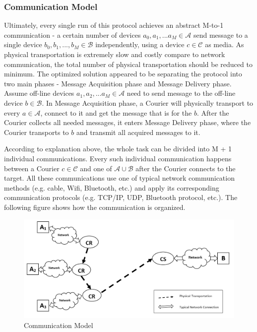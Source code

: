 \subsubsection*{Communication Model}
Ultimately, every single run of this protocol achieves an abstract M-to-1 communication - a certain number of devices $a_0, a_1, ... a_M \in \mathcal{A}$ send message to a single device $b_0, b_1, ..., b_M \in \mathcal{B}$ independently, using a device $c \in \mathcal{C}$ as media. As physical transportation is extremely slow and costly compare to network communication, the total number of physical transportation should be reduced to minimum. The optimized solution appeared to be separating the protocol into two main phases - Message Acquisition phase and Message Delivery phase. Assume off-line devices $a_1, a_2, ... a_M \in \mathcal{A}$ need to send message to the off-line device $b \in \mathcal{B}$. In Message Acquisition phase, a Courier will physically transport to every $a \in \mathcal{A}$, connect to it and get the message that is for the $b$. After the Courier collects all needed messages, it enters Message Delivery phase, where the Courier transports to $b$ and transmit all acquired messages to it.

According to explanation above, the whole task can be divided into M + 1 individual communications. Every such individual communication happens between a Courier $c \in \mathcal{C}$ and one of $\mathcal{A} \cup \mathcal{B}$ after the Courier connects to the target. All these communications use one of typical network communication methods (e.g. cable, Wifi, Bluetooth, etc.) and apply its corresponding communication protocols (e.g. TCP/IP, UDP, Bluetooth protocol, etc.). The following figure shows how the communication is organized.

\begin{figure}[h!]
\includegraphics[width=\textwidth,natwidth=1123,natheight=530]{figures/communicationmodel.png}
\caption{Communication Model}
\end{figure}

